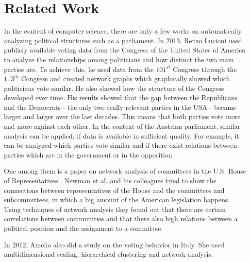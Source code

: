 \chapter{Related Work}
\label{chap:relatedwork}

In the context of computer science, there are only a few works on automatically analyzing political structures such as a parliament. In 2013, Renzo Lucioni \cite{Lucioni_2015} used publicly available voting data from the Congress of the United States of America to analyze the relationships among politicians and how distinct the two main parties are. To achieve this, he used data from the $101^{st}$ Congress through the $113^{th}$ Congress and created network graphs which graphically showed which politicians vote similar. He also showed how the structure of the Congress developed over time. His results showed that the gap between the Republicans and the Democrats - the only two really relevant parties in the USA - became larger and larger over the last decades. This means that both parties vote more and more against each other. In the context of the Austrian parliament, similar analysis can be applied, if data is available in sufficient quality. For example, it can be analyzed which parties vote similar and if there exist relations between parties which are in the government or in the opposition.

One among them is a paper on network analysis of committees in the U.S. House of Representatives \cite{Porter_2005}. Newman et al. and his colleagues tried to show the connections between representatives of the House and the committees and subcommittees, in which a big amount of the American legislation happens. Using techniques of network analysis they found out that there are certain correlations between communities and that there also high relations between a political position and the assignment to a committee. 

In 2012, Amelio \cite{Amelio_2012} also did a study on the voting behavior in Italy. She used multidimensional scaling, hierarchical clustering and network analysis.






